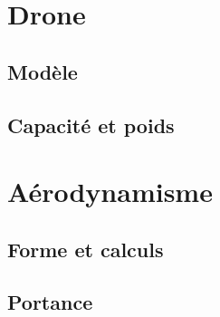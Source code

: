 \documentclass{beamer}
\begin{document}
\section{Drone}

\subsection{Modèle}
\subsection{Capacité et poids}

\section{Aérodynamisme}

\subsection{Forme et calculs}
\subsection{Portance}
\end{document}

